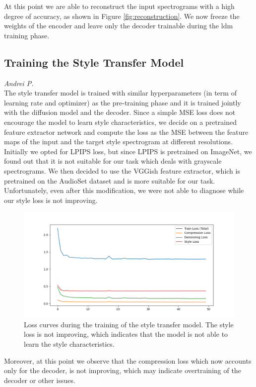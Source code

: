 \noindent At this point we are able to reconstruct the input spectrograms with a high degree of accuracy, as shown in Figure \ref{fig:reconstruction}. We now freeze the weights of the encoder and leave only the decoder trainable during the ldm training phase.

\subsection{Training the Style Transfer Model}
\textit{Andrei P.}\\
The style transfer model is trained with similar hyperparameters (in term of learning rate and optimizer) as the pre-training phase and it is trained jointly with the diffusion model and the decoder. Since a simple MSE loss does not encourage the model to learn style characteristics, we decide on a pretrained feature extractor network and compute the loss as the MSE between the feature maps of the input and the target style spectrogram at different resolutions. Initially we opted for LPIPS loss, but since LPIPS is pretrained on ImageNet, we found out that it is not suitable for our task which deals with grayscale spectrograms. We then decided to use the VGGish feature extractor, which is pretrained on the AudioSet dataset and is more suitable for our task. Unfortunately, even after this modification, we were not able to diagnose while our style loss is not improving.

\begin{figure}[h]
    \centering
    \includegraphics[width=\textwidth]{figures/ldm_loss.png}
    \caption{Loss curves during the training of the style transfer model. The style loss is not improving, which indicates that the model is not able to learn the style characteristics.}
    \label{fig:style_transfer}
\end{figure}

\noindent Moreover, at this point we observe that the compression loss which now accounts only for the decoder, is not improving, which may indicate overtraining of the decoder or other issues.

